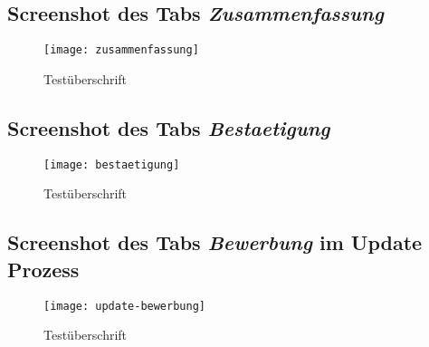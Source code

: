 \begin{landscape}
    \subsection{Screenshot des Tabs \textit{Zusammenfassung}}
    \label{section-zusammenfassung}
    \begin{figure}[H]
        \centering
        \caption{Testüberschrift}
        \begin{adjustbox}{width=\linewidth, center}
            \texttt{[image: zusammenfassung]}
        \end{adjustbox}
    \end{figure}

    \subsection{Screenshot des Tabs \textit{Bestaetigung}}
    \label{section-bestaetigung}
    \begin{figure}[H]
        \centering
        \caption{Testüberschrift}
        \begin{adjustbox}{width=\linewidth, center}
            \texttt{[image: bestaetigung]}
        \end{adjustbox}
    \end{figure}

    \subsection{Screenshot des Tabs \textit{Bewerbung} im Update Prozess}
    \label{section-update-bewerbung}
    \begin{figure}[H]
        \centering
        \caption{Testüberschrift}
        \begin{adjustbox}{width=\linewidth, center}
            \texttt{[image: update-bewerbung]}
        \end{adjustbox}
    \end{figure}

\end{landscape}

